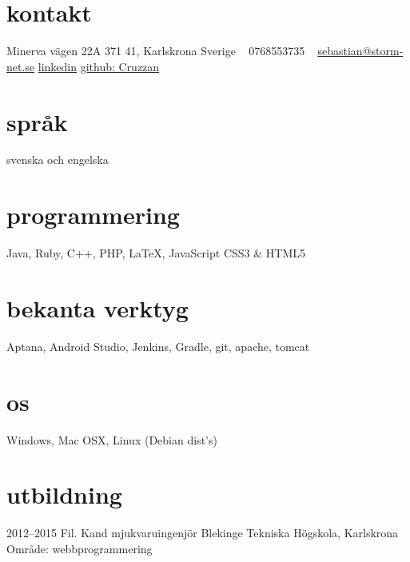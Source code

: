 \documentclass[]{friggeri-cv} %
\begin{document}


\begin{aside} %
\section{kontakt}
Minerva vägen 22A
371 41, Karlskrona
Sverige
~
0768553735
~
\href{mailto:sebastian@storm-net.se}{sebastian@storm-net.se}
\href{https://se.linkedin.com/pub/sebastian-hultstrand/60/51a/151}{linkedin}
\href{https://github.com/cruzzan}{github: Cruzzan}
\section{språk}
svenska och engelska
\section{programmering}
Java, Ruby, C++, PHP,
LaTeX, JavaScript
CSS3 \& HTML5
\section{bekanta verktyg}
Aptana, Android Studio, Jenkins,
Gradle, git, apache, tomcat
\section{os}
Windows, Mac OSX, 
Linux (Debian dist's)
\end{aside}


\section{utbildning}

\begin{entrylist}
\entry
{2012--2015}
{Fil. Kand {\normalfont mjukvaruingenjör}}
{Blekinge Tekniska Högskola, Karlskrona}
{Område: webbprogrammering}
\end{entrylist}
\end{document}
